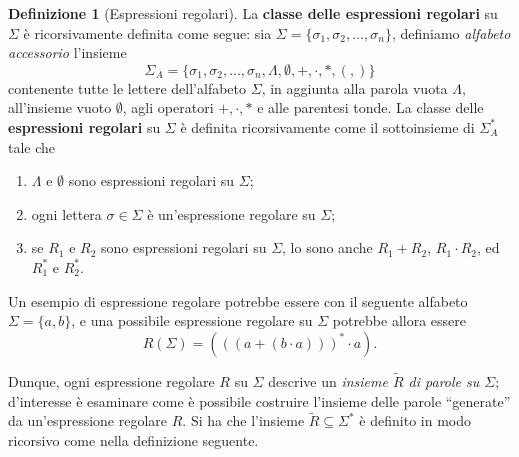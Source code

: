 \documentclass[10pt]{\classname}
\theoremstyle{newlinethm}
\theoremstyle{theorem}
\theoremstyle{definition}
\newtheorem{definizione}{Definizione}[section]
\theoremstyle{definition}
\theoremstyle{definition}
\theoremstyle{definition}
\begin{document}
\begin{definizione}[Espressioni regolari]\label{def:espressioni-regolari}
La \textbf{classe delle espressioni regolari} su $\Sigma$ è ricorsivamente definita come segue: sia $\Sigma = \{\sigma_1, \sigma_2, \dots, \sigma_n\}$, definiamo \emph{alfabeto accessorio} l'insieme \[\Sigma_A = \{\sigma_1, \sigma_2, \dots, \sigma_n, \Lambda, \emptyset, +, \cdot, *, (, )\}\] contenente tutte le lettere dell'alfabeto $\Sigma$, in aggiunta alla parola vuota $\Lambda$, all'insieme vuoto $\emptyset$, agli operatori $+, \cdot, *$ e alle parentesi tonde. La classe delle \textbf{espressioni regolari} su $\Sigma$ è definita ricorsivamente come il sottoinsieme di $\Sigma_A^*$ tale che 
\begin{enumerate}
    \item $\Lambda$ e $\emptyset$ sono espressioni regolari su $\Sigma$;
    \item ogni lettera $\sigma \in \Sigma$ è un'espressione regolare su
        $\Sigma$;
    \item se $R_1$ e $R_2$ sono espressioni regolari su $\Sigma$, lo sono anche
        $R_1 + R_2$, $R_1 \cdot R_2$, ed $R_1^*$ e $R_2^*$.
\end{enumerate}
\end{definizione}

Un esempio di espressione regolare potrebbe essere con il seguente alfabeto $\Sigma = \{a,b\}$, e una possibile espressione regolare su $\Sigma$ potrebbe allora essere \[R (\Sigma) = (((a + (b\cdot a)))^*\cdot a).\]

Dunque, ogni espressione regolare $R$ su $\Sigma$ descrive un \emph{insieme $\tilde{R}$ di parole su $\Sigma$}; d'interesse è esaminare come è possibile costruire l'insieme delle parole ``generate'' da un'espressione regolare $R$. Si ha che l'insieme $\tilde{R}\subseteq \Sigma^*$ è definito in modo ricorsivo come nella definizione seguente.
\end{document}
